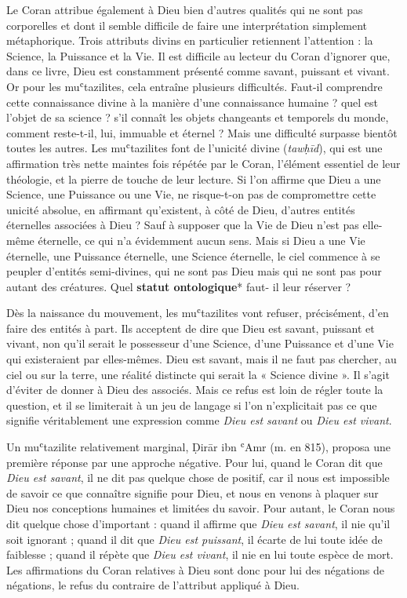 Le Coran attribue également à Dieu bien d'autres qualités qui ne sont
pas corporelles et dont il semble difficile de faire une interprétation
simplement métaphorique. Trois attributs divins en particulier
retiennent l'attention : la Science, la Puissance et la Vie. Il est
difficile au lecteur du Coran d'ignorer que, dans ce livre, Dieu est
constamment présenté comme savant, puissant et vivant. Or pour les
muʿtazilites, cela entraîne plusieurs difficultés. Faut-il comprendre
cette connaissance divine à la manière d'une connaissance humaine ? quel
est l'objet de sa science ? s'il connaît les objets changeants et
temporels du monde, comment reste-t-il, lui, immuable et éternel ? Mais
une difficulté surpasse bientôt toutes les autres. Les muʿtazilites font
de l'unicité divine (\emph{tawḥīd}), qui est une affirmation très nette
maintes fois répétée par le Coran, l'élément essentiel de leur
théologie, et la pierre de touche de leur lecture. Si l'on affirme que
Dieu a une Science, une Puissance ou une Vie, ne risque-t-on pas de
compromettre cette unicité absolue, en affirmant qu'existent, à côté de
Dieu, d'autres entités éternelles associées à Dieu ? Sauf à supposer que
la Vie de Dieu n'est pas elle-même éternelle, ce qui n'a évidemment
aucun sens. Mais si Dieu a une Vie éternelle, une Puissance éternelle,
une Science éternelle, le ciel commence à se peupler d'entités
semi-divines, qui ne sont pas Dieu mais qui ne sont pas pour autant des
créatures. Quel \textbf{statut ontologique}* faut- il leur réserver ?

Dès la naissance du mouvement, les muʿtazilites vont refuser,
précisément, d'en faire des entités à part. Ils acceptent de dire que
Dieu est savant, puissant et vivant, non qu'il serait le possesseur
d'une Science, d'une Puissance et d'une Vie qui existeraient par
elles-mêmes. Dieu est savant, mais il ne faut pas chercher, au ciel ou
sur la terre, une réalité distincte qui serait la « Science divine ». Il
s'agit d'éviter de donner à Dieu des associés. Mais ce refus est loin de
régler toute la question, et il se limiterait à un jeu de langage si
l'on n'explicitait pas ce que signifie véritablement une expression
comme \emph{Dieu est savant} ou \emph{Dieu est vivant}.

Un muʿtazilite relativement marginal, Ḍirār ibn ʿAmr (m. en 815),
proposa une première réponse par une approche négative. Pour lui, quand
le Coran dit que \emph{Dieu est savant}, il ne dit pas quelque chose de
positif, car il nous est impossible de savoir ce que connaître signifie
pour Dieu, et nous en venons à plaquer sur Dieu nos conceptions humaines
et limitées du savoir. Pour autant, le Coran nous dit quelque chose
d'important : quand il affirme que \emph{Dieu est savant}, il nie qu'il
soit ignorant ; quand il dit que \emph{Dieu est puissant}, il écarte de
lui toute idée de faiblesse ; quand il répète que \emph{Dieu est
vivant}, il nie en lui toute espèce de mort. Les affirmations du Coran
relatives à Dieu sont donc pour lui des négations de négations, le refus
du contraire de l'attribut appliqué à Dieu.


